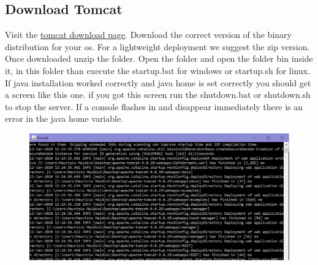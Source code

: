 \subsection{Download Tomcat}
Visit the \href{https://tomcat.apache.org/download-90.cgi}{tomcat download page}.
Download the correct version of the binary distribution for your os. For a lightweight deployment we suggest the zip version.
Once downloaded unzip the folder. Open the folder and open the folder bin inside it, in this folder than execute the startup.bat for windows or startup.sh for linux. If java installation worked correctly and java home is set correctly you should get a screen like this one.
if you got this screen run the shutdown.bat or shutdown.sh to stop the server. If a console flashes in and disappear immediately there is an error in the java home variable.
\begin{figure}[h]
\centering
\includegraphics[width=\textwidth]{Images/tomcatStartup.png}
\end{figure} 
\clearpage
